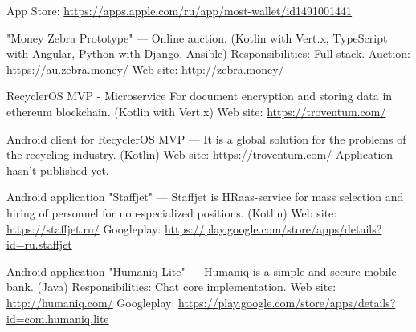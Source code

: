 \begin{cventries}
{\begin{cvitems}
{\begin{flushleft}
            App Store: \url{https://apps.apple.com/ru/app/most-wallet/id1491001441}\linebreak
        \end{flushleft}
    }
    \item {
        \begin{flushleft}
            "Money Zebra Prototype" --- Online auction. (Kotlin with Vert.x, TypeScript with Angular, Python with Django, Ansible)\linebreak
            Responsibilities: Full stack.\linebreak
            Auction: \url{https://au.zebra.money/}\linebreak
            Web site: \url{http://zebra.money/}\linebreak
        \end{flushleft}
    }
    \item {
        \begin{flushleft}
            RecyclerOS MVP - Microservice For document encryption and storing data in ethereum blockchain. (Kotlin with Vert.x)\linebreak
            Web site: \url{https://troventum.com/}\linebreak
        \end{flushleft}
    }
    \item {
        \begin{flushleft}
            Android client for RecyclerOS MVP — It is a global solution for the problems of the recycling industry. (Kotlin)\linebreak
            Web site: \url{https://troventum.com/}\linebreak
            Application hasn't published yet.\linebreak
        \end{flushleft}
    }
    \item {
        \begin{flushleft}
            Android application "Staffjet" --- Staffjet is HRaas-service for mass selection and hiring of personnel for non-specialized positions. (Kotlin)\linebreak
            Web site: \url{https://staffjet.ru/}\linebreak
            Googleplay: \url{https://play.google.com/store/apps/details?id=ru.staffjet}\linebreak
        \end{flushleft}
    }
    \item {
        \begin{flushleft}
            Android application "Humaniq Lite" --- Humaniq is a simple and secure mobile bank. (Java)\linebreak
            Responsibilities: Chat core implementation.\linebreak
            Web site: \url{http://humaniq.com/}\linebreak
            Googleplay: \url{https://play.google.com/store/apps/details?id=com.humaniq.lite}\linebreak
        \end{flushleft}
    }
\end{cvitems}
}


\end{cventries}
